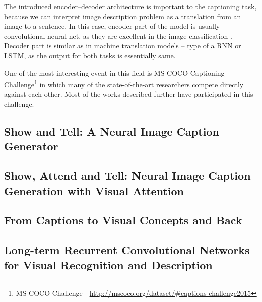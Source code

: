 The introduced encoder--decoder architecture is important to the captioning task, because we can interpret image description problem as a translation from an image to a sentence. In this case, encoder part of the model is usually convolutional neural net, as they are excellent in the image classification \cite{DBLP:journals/corr/SzegedyLJSRAEVR14}. Decoder part is similar as in machine translation models -- type of a RNN or LSTM, as the output for both tasks is essentially same.

One of the most interesting event in this field is MS COCO Captioning Challenge\footnote{MS COCO Challenge - \url{http://mscoco.org/dataset/\#captions-challenge2015}} in which many of the state-of-the-art researchers compete directly against each other. Most of the works described further have participated in this challenge.


		\subsection{Show and Tell: A Neural Image Caption Generator}
		\cite{DBLP:journals/corr/VinyalsTBE14}
		
		
		\subsection{Show, Attend and Tell: Neural Image Caption Generation with Visual Attention}
		\cite{DBLP:journals/corr/XuBKCCSZB15}
		
		\subsection{From Captions to Visual Concepts and Back}
		\cite{DBLP:journals/corr/FangGISDDGHMPZZ14}
		
		\subsection{Long-term Recurrent Convolutional Networks for Visual Recognition and Description}
		\cite{DBLP:journals/corr/DonahueHGRVSD14}


